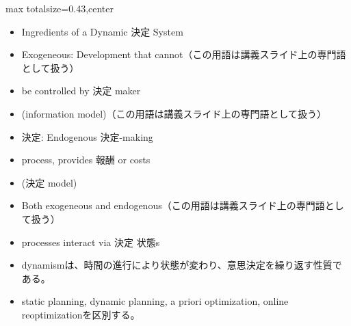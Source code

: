\clearpage
{}
\begin{minipage}[t]{0.405\textwidth}
\begin{adjustbox}{max totalsize={\textwidth}{0.43\textheight},center}
\begin{minipage}{\textwidth}\scriptsize
{}\begin{itemize}
\item Ingredients of a Dynamic 決定 System
\item Exogeneous: Development that cannot（この用語は講義スライド上の専門語として扱う）
\item be controlled by 決定 maker
\item (information model)（この用語は講義スライド上の専門語として扱う）
\item 決定: Endogenous 決定-making
\item process, provides 報酬 or costs
\item (決定 model)
\item Both exogeneous and endogenous（この用語は講義スライド上の専門語として扱う）
\item processes interact via 決定 状態s
\end{itemize}\begin{itemize}
\item dynamismは、時間の進行により状態が変わり、意思決定を繰り返す性質である。
\item static planning, dynamic planning, a priori optimization, online reoptimizationを区別する。
\end{itemize}
\end{minipage}
\end{adjustbox}
\end{minipage}\hfill
